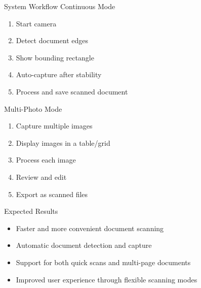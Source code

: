 \documentclass{beamer}
\begin{document}
\begin{frame}{System Workflow}
    Continuous Mode
\begin{enumerate}
\item Start camera
\item Detect document edges
\item Show bounding rectangle
\item Auto-capture after stability
\item Process and save scanned document
\end{enumerate}
Multi-Photo Mode
\begin{enumerate}
\item Capture multiple images
\item Display images in a table/grid
\item Process each image
\item Review and edit
\item Export as scanned files
\end{enumerate}
\end{frame}

\begin{frame}{Expected Results}
    \begin{itemize}
        \item Faster and more convenient document scanning

\item Automatic document detection and capture

\item Support for both quick scans and multi-page documents

\item Improved user experience through flexible scanning modes
    \end{itemize}
\end{frame}
\end{document}
